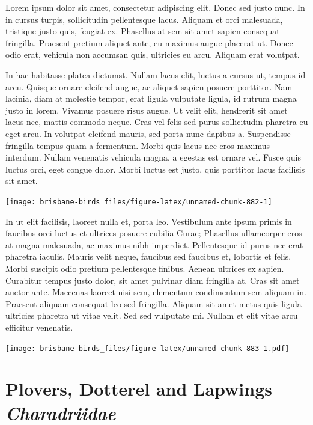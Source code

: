 \documentclass[]{book}
\let\origfigure\figure
\let\endorigfigure\endfigure
\renewenvironment{figure}[1][2] {
  \expandafter\origfigure\expandafter[H]
} {
  \endorigfigure
}
\begin{document}
Lorem ipsum dolor sit amet, consectetur adipiscing elit. Donec sed justo
nunc. In in cursus turpis, sollicitudin pellentesque lacus. Aliquam et
orci malesuada, tristique justo quis, feugiat ex. Phasellus at sem sit
amet sapien consequat fringilla. Praesent pretium aliquet ante, eu
maximus augue placerat ut. Donec odio erat, vehicula non accumsan quis,
ultricies eu arcu. Aliquam erat volutpat.

In hac habitasse platea dictumst. Nullam lacus elit, luctus a cursus ut,
tempus id arcu. Quisque ornare eleifend augue, ac aliquet sapien posuere
porttitor. Nam lacinia, diam at molestie tempor, erat ligula vulputate
ligula, id rutrum magna justo in lorem. Vivamus posuere risus augue. Ut
velit elit, hendrerit sit amet lacus nec, mattis commodo neque. Cras vel
felis sed purus sollicitudin pharetra eu eget arcu. In volutpat eleifend
mauris, sed porta nunc dapibus a. Suspendisse fringilla tempus quam a
fermentum. Morbi quis lacus nec eros maximus interdum. Nullam venenatis
vehicula magna, a egestas est ornare vel. Fusce quis luctus orci, eget
congue dolor. Morbi luctus est justo, quis porttitor lacus facilisis sit
amet.

\begin{figure}
\texttt{[image: brisbane-birds\_files/figure-latex/unnamed-chunk-882-1]} \caption{insert figure caption}\label{fig:unnamed-chunk-882}
\end{figure}

In ut elit facilisis, laoreet nulla et, porta leo. Vestibulum ante ipsum
primis in faucibus orci luctus et ultrices posuere cubilia Curae;
Phasellus ullamcorper eros at magna malesuada, ac maximus nibh
imperdiet. Pellentesque id purus nec erat pharetra iaculis. Mauris velit
neque, faucibus sed faucibus et, lobortis et felis. Morbi suscipit odio
pretium pellentesque finibus. Aenean ultrices ex sapien. Curabitur
tempus justo dolor, sit amet pulvinar diam fringilla at. Cras sit amet
auctor ante. Maecenas laoreet nisi sem, elementum condimentum sem
aliquam in. Praesent aliquam consequat leo sed fringilla. Aliquam sit
amet metus quis ligula ultricies pharetra ut vitae velit. Sed sed
vulputate mi. Nullam et elit vitae arcu efficitur venenatis.

\begin{figure}
\centering
\texttt{[image: brisbane-birds\_files/figure-latex/unnamed-chunk-883-1.pdf]}
\caption{\label{fig:unnamed-chunk-883}insert figure caption}
\end{figure}

\chapter{\texorpdfstring{Plovers, Dotterel and Lapwings
\emph{Charadriidae}}{Plovers, Dotterel and Lapwings Charadriidae}}\label{plovers-dotterel-and-lapwings-charadriidae}
\end{document}
